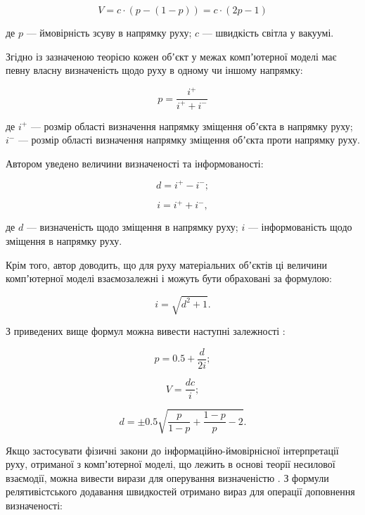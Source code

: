 \[
V=c\cdot(p-(1-p))=c\cdot(2p-1)
\]

\noindent
де $p$ --- ймовірність зсуву в напрямку руху; $c$ --- швидкість світла у вакуумі.

Згідно із зазначеною теорією кожен обʼєкт у межах компʼютерної моделі має певну власну визначеність щодо руху в одному чи іншому напрямку:

\[
p=\frac{i^+}{i^+ + i^-}
\]

\noindent
де $i^+$ --- розмір області визначення напрямку зміщення обʼєкта в напрямку руху; $i^-$ --- розмір області визначення напрямку зміщення обʼєкта проти напрямку руху.

Автором уведено величини визначеності та інформованості:

\begin{equation}
\label{eq:tnv3}
d=i^+ - i^-;
\end{equation}

\begin{equation}
\label{eq:tnv4}
i=i^+ + i^-,
\end{equation}

\noindent
де $d$ --- визначеність щодо зміщення в напрямку руху; $i$ --- інформованість щодо зміщення в напрямку руху.

Крім того, автор доводить, що для руху матеріальних обʼєктів ці величини компʼютерної моделі взаємозалежні і можуть бути обраховані за формулою:

\begin{equation}
\label{eq:tnv7}
i=\sqrt{d^2+1}.
\end{equation}

З приведених вище формул можна вивести наступні залежності \cite{Teslia_2010}:

\begin{equation}
\label{eq:tnv5}
p=0.5+\frac{d}{2i};
\end{equation}

\begin{equation}
\label{eq:tnv6}
V=\frac{dc}{i};
\end{equation}

\begin{equation}
\label{eq:tnv8}
d=\pm0.5\sqrt{\frac{p}{1-p}+\frac{1-p}{p}-2}.
\end{equation}

Якщо застосувати фізичні закони до інформаційно-ймовірнісної інтерпретації руху, отриманої з компʼютерної моделі, що лежить в основі теорії несилової взаємодії, можна вивести вирази для оперування визначеністю \cite{Teslia_2010_2}. З формули релятивістського додавання швидкостей отримано вираз для операції доповнення визначеності:

